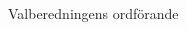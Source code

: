 \documentclass[../_main/handlingar.tex]{subfiles}
\begin{document}


\begin{signatures}{1}
    \mvh
    \signature{Axel Voss}{Valberedningens ordförande}
\end{signatures}
\end{document}
